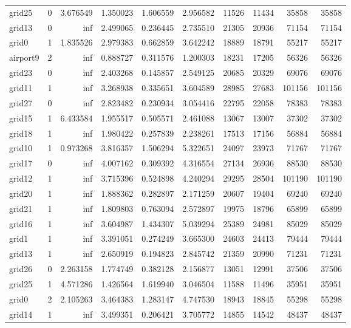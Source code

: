 \begin{longtable}{|l|r|r|r|r|r|r|r|r|r|}
grid25 & 0 & 3.676549 & 1.350023 & 1.606559 & 2.956582 & 11526 & 11434 & 35858 & 35858 \\
grid13 & 0 & inf & 2.499065 & 0.236445 & 2.735510 & 21305 & 20936 & 71154 & 71154 \\
grid0 & 1 & 1.835526 & 2.979383 & 0.662859 & 3.642242 & 18889 & 18791 & 55217 & 55217 \\
airport9 & 2 & inf & 0.888727 & 0.311576 & 1.200303 & 18231 & 17205 & 56326 & 56326 \\
grid23 & 0 & inf & 2.403268 & 0.145857 & 2.549125 & 20685 & 20329 & 69076 & 69076 \\
grid11 & 1 & inf & 3.268938 & 0.335651 & 3.604589 & 28985 & 27683 & 101156 & 101156 \\
grid27 & 0 & inf & 2.823482 & 0.230934 & 3.054416 & 22795 & 22058 & 78383 & 78383 \\
grid15 & 1 & 6.433584 & 1.955517 & 0.505571 & 2.461088 & 13067 & 13007 & 37302 & 37302 \\
grid18 & 1 & inf & 1.980422 & 0.257839 & 2.238261 & 17513 & 17156 & 56884 & 56884 \\
grid10 & 1 & 0.973268 & 3.816357 & 1.506294 & 5.322651 & 24097 & 23973 & 71767 & 71767 \\
grid17 & 0 & inf & 4.007162 & 0.309392 & 4.316554 & 27134 & 26936 & 88530 & 88530 \\
grid12 & 1 & inf & 3.715396 & 0.524898 & 4.240294 & 29295 & 28504 & 101190 & 101190 \\
grid20 & 1 & inf & 1.888362 & 0.282897 & 2.171259 & 20607 & 19404 & 69240 & 69240 \\
grid21 & 1 & inf & 1.809803 & 0.763094 & 2.572897 & 19975 & 18796 & 65899 & 65899 \\
grid16 & 1 & inf & 3.604987 & 1.434307 & 5.039294 & 25389 & 24981 & 85029 & 85029 \\
grid1 & 1 & inf & 3.391051 & 0.274249 & 3.665300 & 24603 & 24413 & 79444 & 79444 \\
grid13 & 1 & inf & 2.650919 & 0.194823 & 2.845742 & 21359 & 20990 & 71231 & 71231 \\
grid26 & 0 & 2.263158 & 1.774749 & 0.382128 & 2.156877 & 13051 & 12991 & 37506 & 37506 \\
grid25 & 1 & 4.571286 & 1.426564 & 1.619940 & 3.046504 & 11588 & 11496 & 35951 & 35951 \\
grid0 & 2 & 2.105263 & 3.464383 & 1.283147 & 4.747530 & 18943 & 18845 & 55298 & 55298 \\
grid14 & 1 & inf & 3.499351 & 0.206421 & 3.705772 & 14855 & 14542 & 48437 & 48437 \\

\end{longtable}
